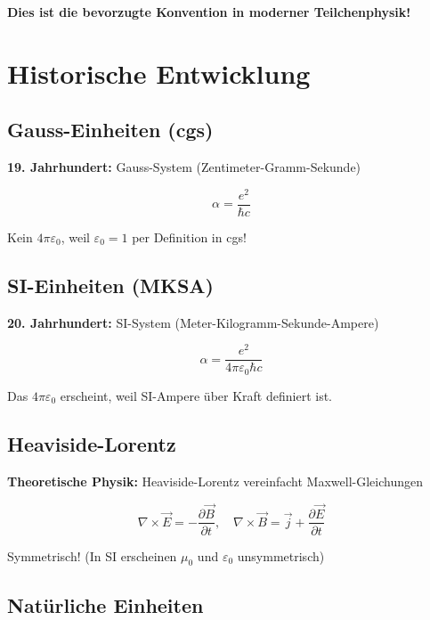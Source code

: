 	\textbf{Dies ist die bevorzugte Konvention in moderner Teilchenphysik!}
	
	\section{Historische Entwicklung}
	
	\subsection{Gauss-Einheiten (cgs)}
	
	\textbf{19. Jahrhundert:} Gauss-System (Zentimeter-Gramm-Sekunde)
	
	\begin{equation}
		\alpha = \frac{e^2}{\hbar c}
	\end{equation}
	
	Kein $4\pi\varepsilon_0$, weil $\varepsilon_0 = 1$ per Definition in cgs!
	
	\subsection{SI-Einheiten (MKSA)}
	
	\textbf{20. Jahrhundert:} SI-System (Meter-Kilogramm-Sekunde-Ampere)
	
	\begin{equation}
		\alpha = \frac{e^2}{4\pi\varepsilon_0\hbar c}
	\end{equation}
	
	Das $4\pi\varepsilon_0$ erscheint, weil SI-Ampere über Kraft definiert ist.
	
	\subsection{Heaviside-Lorentz}
	
	\textbf{Theoretische Physik:} Heaviside-Lorentz vereinfacht Maxwell-Gleichungen
	
	\begin{equation}
		\nabla \times \vec{E} = -\frac{\partial \vec{B}}{\partial t}, \quad \nabla \times \vec{B} = \vec{j} + \frac{\partial \vec{E}}{\partial t}
	\end{equation}
	
	Symmetrisch! (In SI erscheinen $\mu_0$ und $\varepsilon_0$ unsymmetrisch)
	
	\subsection{Natürliche Einheiten}
	
